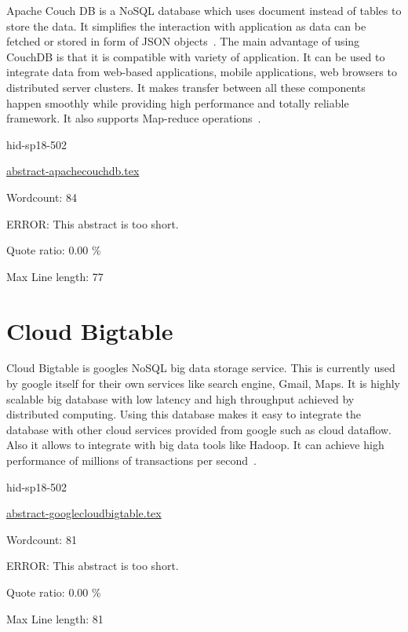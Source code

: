Apache Couch DB is a NoSQL database which uses document instead of tables to
store the data. It simplifies the interaction with application as data can be
fetched or stored in form of JSON objects~\cite{hid-sp18-502-ApacheCouchDB}.
The main advantage of using CouchDB is that it is compatible with variety of
application. It can be used to integrate data from web-based applications,
mobile applications, web browsers to distributed server clusters. It makes
transfer between all these components happen smoothly while providing high
performance and totally reliable framework. It also supports Map-reduce
operations~\cite{hid-sp18-502-ApacheCouchDB}.


\begin{IU}

hid-sp18-502

\href{https://github.com/cloudmesh-community/hid-sp18-502/blob/master//technology/abstract-apachecouchdb.tex}{abstract-apachecouchdb.tex}

 

Wordcount: 84

ERROR: This abstract is too short.


Quote ratio: 0.00 \%
 
Max Line length: 77
\end{IU}

\section{Cloud Bigtable}

Cloud Bigtable is googles NoSQL big data storage service. This is currently
used by google itself for their own services like search engine, Gmail, Maps.
It is highly scalable big database with low latency and high throughput achieved
by distributed computing. Using this database makes it easy to integrate the
database with other cloud services provided from google such as cloud dataflow.
Also it allows to integrate with big data tools like Hadoop. It can achieve high 
performance of millions of transactions per  
second~\cite{hid-sp18-502-GoogleCloudBigtable}.





\begin{IU}

hid-sp18-502

\href{https://github.com/cloudmesh-community/hid-sp18-502/blob/master//technology/abstract-googlecloudbigtable.tex}{abstract-googlecloudbigtable.tex}

 

Wordcount: 81

ERROR: This abstract is too short.


Quote ratio: 0.00 \%
 
Max Line length: 81
\end{IU}

